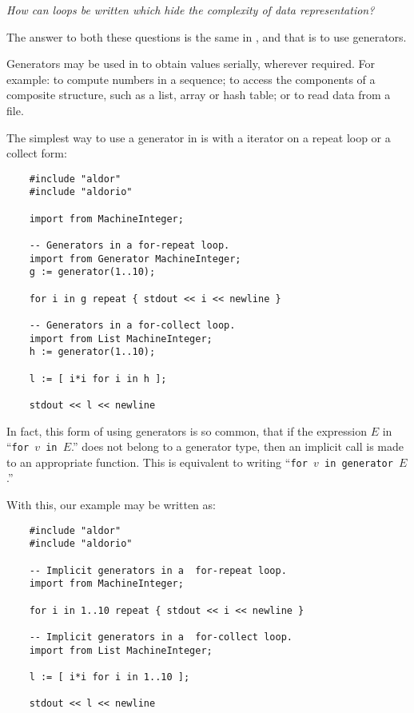 {\em How can loops be written which hide the complexity of data representation?}

The answer to both these questions is the same in \asharp{}, and that is
to use generators.


Generators may be used in \asharp{} to obtain values serially,
wherever required.  
For example:
to compute numbers in a sequence;
to access the components of a composite structure,
such as a list, array or hash table;
or to read data from a file.

The simplest way to use a generator in \asharp{} is with a 
iterator on a repeat loop or a collect form:

\begin{small}
\begin{verbatim}
    #include "aldor"
    #include "aldorio"

    import from MachineInteger;

    -- Generators in a for-repeat loop.
    import from Generator MachineInteger;
    g := generator(1..10);

    for i in g repeat { stdout << i << newline }

    -- Generators in a for-collect loop.
    import from List MachineInteger;
    h := generator(1..10);

    l := [ i*i for i in h ];

    stdout << l << newline
\end{verbatim}
\end{small}


In fact, this form of using generators is so common, that if the
expression $E$ in
%
``{\tt for~$v$~in~$E$}.''
%
does not belong to a generator type,
then an implicit call is made to an appropriate  function.
This is equivalent to writing
%
``{\tt for~$v$~in~generator~$E$}.''

With this, our example may be written as:

\begin{small}
\begin{verbatim}
    #include "aldor"
    #include "aldorio"

    -- Implicit generators in a  for-repeat loop.
    import from MachineInteger;

    for i in 1..10 repeat { stdout << i << newline }

    -- Implicit generators in a  for-collect loop.
    import from List MachineInteger;

    l := [ i*i for i in 1..10 ];

    stdout << l << newline
\end{verbatim}
\end{small}

